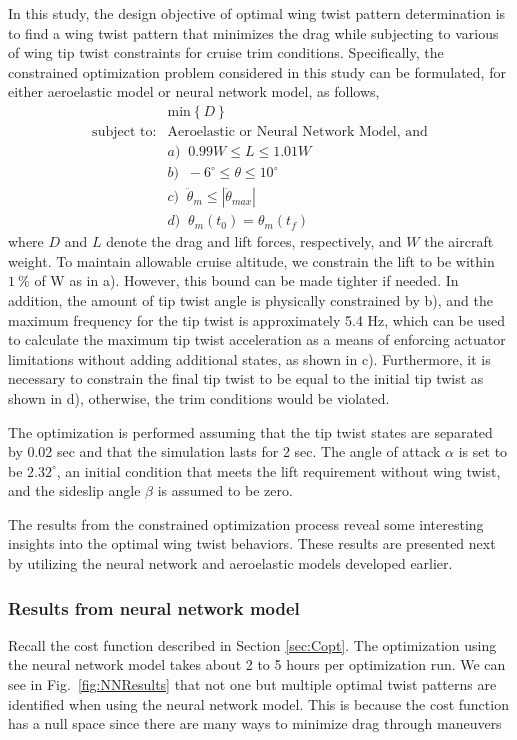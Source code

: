 \documentclass[11pt]{ucthesis}
\begin{document}
In this study, the design objective of optimal wing twist pattern determination is to find a wing twist pattern that minimizes the drag while subjecting to various of wing tip twist constraints for cruise trim conditions. Specifically, the constrained optimization problem considered in this study can be formulated, for either aeroelastic model or neural network model, as follows,
\begin{equation}    \label{eqn:COpt}
\begin{array}{rll}
& \mbox{min}\left \{ D \right \} \;\; \\
\mbox{subject to:} & \mbox{Aeroelastic or Neural Network Model, and}\\
& a) \;\; 0.99W \le L \le 1.01W \\
& b) \;\; -6^\circ \le \theta \le 10^\circ \\
& c) \;\; \ddot{\theta}_m \le|\ddot{\theta}_{max}|\\
& d) \;\; \theta_m (t_0) = \theta_m (t_{f})
\end{array}
\end{equation}
where $D$ and $L$ denote the drag and lift forces, respectively, and $W$ the aircraft weight. To maintain allowable cruise altitude, we constrain the lift to be within $1~\%$ of W as in a). However, this bound can be made tighter if needed. In addition, the amount of tip twist angle is physically constrained by b), and the maximum frequency for the tip twist is approximately 5.4 Hz, which can be used to calculate the maximum tip twist acceleration as a means of enforcing actuator limitations without adding additional states, as shown in c). Furthermore, it is necessary to constrain the final tip twist to be equal to the initial tip twist as shown in d), otherwise, the trim conditions would be violated.    

The optimization is performed assuming that the tip twist states are separated by 0.02 sec and that the simulation lasts for 2 sec. The angle of attack $\alpha$ is set to be $2.32^{\circ}$, an initial condition that meets the lift requirement without wing twist, and the sideslip angle $\beta$ is assumed to be zero. 

The results from the constrained optimization process reveal some interesting insights into the optimal wing twist behaviors. These results are presented next by utilizing the neural network and aeroelastic models developed earlier.

\subsubsection{Results from neural network model}
\label{sec:NNresults}
Recall the cost function described in Section \ref{sec:Copt}. The optimization using the neural network model takes about 2 to 5 hours per optimization run. We can see in Fig.~\ref{fig:NNResults} that not one but multiple optimal twist patterns are identified when using the neural network model. This is because the cost function has a null space since there are many ways to minimize drag through maneuvers
\end{document}
